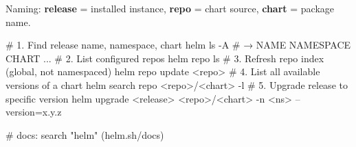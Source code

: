 \begin{tcbitemize}[
  raster columns=3, raster equal height=rows,
  blanker, cheat subtitle
]
\begin{tcbitemize}[
      raster columns=1, raster equal height=rows,
      blanker, cheat subtitle
    ]
      \tcbitem
          {\fontsize{6.5}{7.5}\selectfont\sffamily
          Naming: \textbf{release} = installed instance, \textbf{repo} = chart source, \textbf{chart} = package name.}
          \begin{cheatcodebash}
          # 1. Find release name, namespace, chart
          helm ls -A   # → NAME  NAMESPACE  CHART  ...
          # 2. List configured repos
          helm repo ls
          # 3. Refresh repo index (global, not namespaced)
          helm repo update <repo>
          # 4. List all available versions of a chart
          helm search repo <repo>/<chart> -l
          # 5. Upgrade release to specific version
          helm upgrade <release> <repo>/<chart> -n <ns> --version=x.y.z
          \end{cheatcodebash}
          \vspace{-0.5ex}
          \begin{cheatcodebash}
          # docs: search "helm" (helm.sh/docs)
          \end{cheatcodebash}

    \end{tcbitemize}

\end{tcbitemize}
